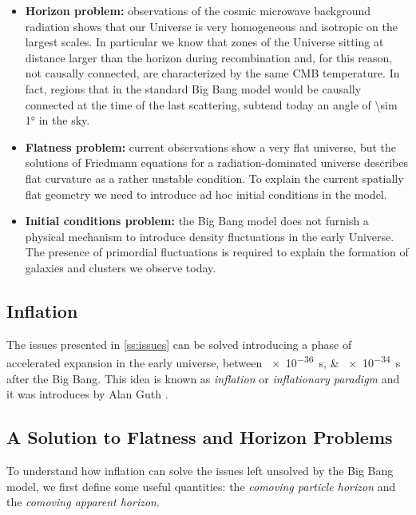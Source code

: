 \begin{itemize}
        \item \textbf{Horizon problem:} observations of the cosmic
        microwave background radiation shows that our Universe is very
        homogeneous and isotropic on the largest scales. In particular we
        know that zones of the Universe sitting at distance larger than the
        horizon during recombination and, for this reason, not causally
        connected, are characterized by the same CMB temperature.
        In fact, regions that in the standard Big Bang model would be causally
        connected at the time of the last scattering, subtend today an
        angle of \ang{\sim 1} in the sky.

        \item \textbf{Flatness problem:} current observations show a very
        flat universe, but the solutions of Friedmann equations for a
        radiation-dominated universe describes flat curvature as a rather
        unstable condition. To explain the current spatially flat geometry
        we need to introduce ad hoc initial conditions in the model.

        \item \textbf{Initial conditions problem:} the Big Bang model
        does not furnish a physical mechanism to introduce density
        fluctuations in the early Universe. The presence of primordial
        fluctuations is required to explain the formation of galaxies and
        clusters we observe today.
\end{itemize}

\subsection{Inflation}

The issues presented in \autoref{ss:issues} can be solved introducing a
phase of accelerated expansion in the early universe, between
\SIlist{e-36;e-34}{\second} after the Big Bang. This idea is known as
\emph{inflation} or \emph{inflationary paradigm} and it was introduces by
Alan Guth \autocite{guth1981inflationary}.

\subsection{A Solution to Flatness and Horizon Problems}

To understand how inflation can solve the issues left unsolved by the Big Bang
model, we first define some useful quantities: the \emph{comoving particle
horizon} and the \emph{comoving apparent horizon}.

